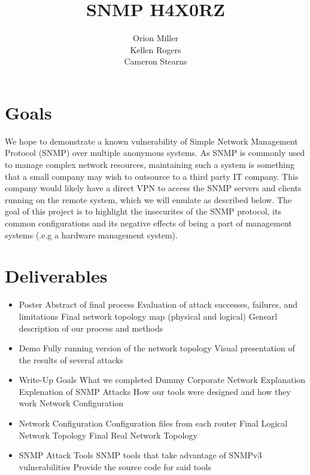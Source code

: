 \documentclass[pdftex, 11pt]{article}
\title{SNMP H4X0RZ}
\author{Orion Miller \\ Kellen Rogers \\ Cameron Stearns}
\begin{document}
\singlespace



\pagebreak

\setcounter{secnumdepth}{2}

\section{Goals}
We hope to demonstrate a known vulnerability of Simple Network Management 
Protocol (SNMP) over multiple anonymous systems.  As SNMP is commonly used 
to manage complex network resources, maintaining such a system is something 
that a small company may wish to outsource to a third party IT company.  
This company would likely have a direct VPN to access the SNMP servers and 
clients running on the remote system, which we will emulate as described below. 
The goal of this project is to highlight the insecurites of the SNMP protocol,
its common configurations and its negative effects of being a part of 
management systems (.e.g a hardware management system).

\section{Deliverables}

\begin{itemize}
\item Poster
  \subitem Abstract of final process
  \subitem Evaluation of attack successes, failures, and limitations
  \subitem Final network topology map (physical and logical)
  \subitem Genearl description of our process and methods

\item Demo
  \subitem Fully running version of the network topology %
  \subitem Visual presentation of the results of several attacks

\item Write-Up
  \subitem Goals
  \subitem What we completed
  \subitem Dummy Corporate Network Explanation
  \subitem Explenation of SNMP Attacks
  \subitem How our tools were designed and how they work
  \subitem Network Configuration

\item Network Configuration
  \subitem Configuration files from each router
  \subitem Final Logical Network Topology
  \subitem Final Real Network Topology

\item SNMP Attack Tools
  \subitem SNMP tools that take advantage of SNMPv3  vulnerabilities
  \subitem Provide the source code for said tools

\end{itemize}
\end{document}
